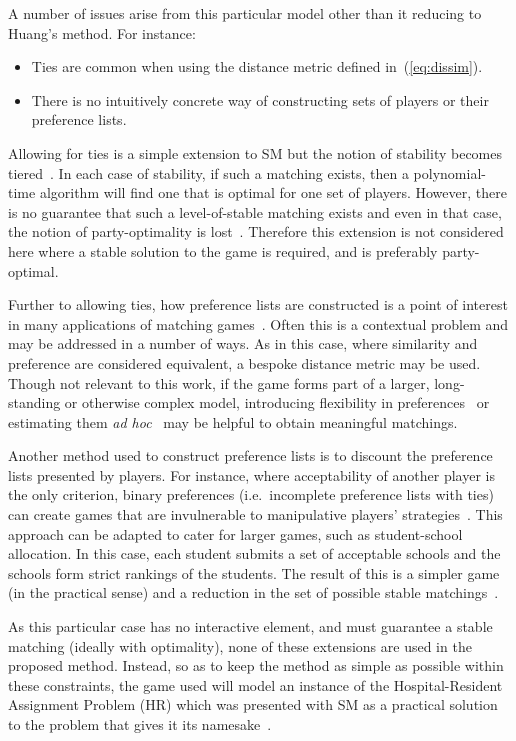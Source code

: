 A number of issues arise from this particular model other than it reducing to
Huang's method. For instance:
\begin{itemize}
    \item Ties are common when using the distance metric defined
        in~(\ref{eq:dissim}).
    \item There is no intuitively concrete way of constructing sets of players
        or their preference lists.
\end{itemize}

Allowing for ties is a simple extension to SM but the notion of stability
becomes tiered~\cite{Manlove1999}. In each case of stability, if such a matching
exists, then a polynomial-time algorithm will find one that is optimal for one
set of players. However, there is no guarantee that such a level-of-stable
matching exists and even in that case, the notion of party-optimality is
lost~\cite{Erdil2017}. Therefore this extension is not considered here where a
stable solution to the game is required, and is preferably party-optimal.

Further to allowing ties, how preference lists are constructed is a point of
interest in many applications of matching games~\cite{Iwama2008}. Often this is
a contextual problem and may be addressed in a number of ways. As in this case,
where similarity and preference are considered equivalent, a bespoke distance
metric may be used. Though not relevant to this work, if the game forms part of
a larger, long-standing or otherwise complex model, introducing flexibility in
preferences~\cite{Agarwal2017,Menzel2015} or estimating them \emph{ad
hoc}~\cite{Rastegari2016} may be helpful to obtain meaningful matchings.

Another method used to construct preference lists is to discount the preference
lists presented by players. For instance, where acceptability of another player
is the only criterion, binary preferences (i.e.\ incomplete preference lists
with ties) can create games that are invulnerable to manipulative players'
strategies~\cite{Bogomolnaia2004}. This approach can be adapted to cater for
larger games, such as student-school allocation. In this case, each student
submits a set of acceptable schools and the schools form strict rankings of the
students. The result of this is a simpler game (in the practical sense) and a
reduction in the set of possible stable matchings~\cite{Haeringer2014}.

As this particular case has no interactive element, and must guarantee a stable
matching (ideally with optimality), none of these extensions are used in the
proposed method. Instead, so as to keep the method as simple as possible within
these constraints, the game used will model an instance of the Hospital-Resident
Assignment Problem (HR) which was presented with SM as a practical solution to
the problem that gives it its namesake~\cite{Gale1962}.

